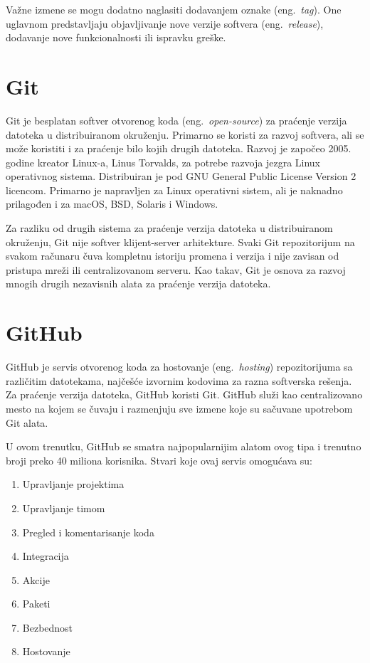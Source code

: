 \documentclass[12pt]{report}
\begin{document}
Važne izmene se mogu dodatno naglasiti dodavanjem oznake (eng.\ \textit{tag}). One uglavnom predstavljaju objavljivanje nove verzije softvera (eng.\ \textit{release}), dodavanje nove funkcionalnosti ili ispravku greške.

\section{Git}
Git \cite{git} je besplatan softver otvorenog koda (eng.\ \textit{open-source}) za praćenje verzija datoteka u distribuiranom okruženju. Primarno se koristi za razvoj softvera, ali se može koristiti i za praćenje bilo kojih drugih datoteka. Razvoj je započeo 2005. godine kreator Linux-a, Linus Torvalds, za potrebe razvoja jezgra Linux operativnog sistema. Distribuiran je pod GNU General Public License Version 2 licencom. Primarno je napravljen za Linux operativni sistem, ali je naknadno prilagođen i za macOS, BSD, Solaris i Windows.

Za razliku od drugih sistema za praćenje verzija datoteka u distribuiranom okruženju, Git nije softver klijent-server arhitekture. Svaki Git repozitorijum na svakom računaru čuva kompletnu istoriju promena i verzija i nije zavisan od pristupa mreži ili centralizovanom serveru. Kao takav, Git je osnova za razvoj mnogih drugih nezavisnih alata za praćenje verzija datoteka.

\section{GitHub}
GitHub \cite{github} je servis otvorenog koda za hostovanje (eng.\ \textit{hosting}) repozitorijuma sa različitim datotekama, najčešće izvornim kodovima za razna softverska rešenja. Za praćenje verzija datoteka, GitHub koristi Git. GitHub služi kao centralizovano mesto na kojem se čuvaju i razmenjuju sve izmene koje su sačuvane upotrebom Git alata.

U ovom trenutku, GitHub se smatra najpopularnijim alatom ovog tipa i trenutno broji preko 40 miliona korisnika. Stvari koje ovaj servis omogućava su:

\begin{enumerate}
    \item Upravljanje projektima
    \item Upravljanje timom
    \item Pregled i komentarisanje koda
    \item Integracija
    \item Akcije
    \item Paketi
    \item Bezbednost
    \item Hostovanje
\end{enumerate}
\end{document}
